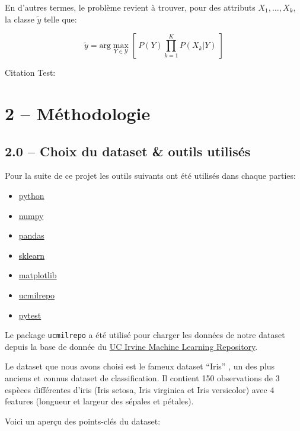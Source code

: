\documentclass[
]{article}
\providecommand{\tightlist}{%
  \setlength{\itemsep}{0pt}\setlength{\parskip}{0pt}}
\begin{document}
En d'autres termes, le problème revient à trouver, pour des attributs
\(X_1, \ldots, X_k\), la classe \(\tilde{y}\) telle que:

\[
\tilde{y} = \text{arg}\max_{Y \in \mathcal{Y}} \left[\  P(Y) \prod_{k = 1}^K{P(X_k | Y)}\  \right]
\]

Citation Test: \cite{LinearModels}

\hypertarget{muxe9thodologie}{%
\section{2 -- Méthodologie}\label{muxe9thodologie}}

\hypertarget{choix-du-dataset-outils-utilisuxe9s}{%
\subsection{2.0 -- Choix du dataset \& outils
utilisés}\label{choix-du-dataset-outils-utilisuxe9s}}

Pour la suite de ce projet les outils suivants ont été utilisés dans
chaque parties:

\begin{itemize}
\tightlist
\item
  \href{https://www.python.org/}{python}
\item
  \href{https://numpy.org/}{numpy}
\item
  \href{https://pandas.pydata.org/}{pandas}
\item
  \href{https://scikit-learn.org/stable/}{sklearn}
\item
  \href{https://matplotlib.org/}{matplotlib}
\item
  \href{https://github.com/uci-ml-repo/ucimlrepo}{ucmilrepo}
\item
  \href{https://docs.pytest.org/en/stable/}{pytest}
\end{itemize}

Le package \texttt{ucmilrepo} a été utilisé pour charger les données de
notre dataset depuis la base de donnée du
\href{https://archive.ics.uci.edu/ml/index}{UC Irvine Machine Learning
Repository}.

Le dataset que nous avons choisi est le fameux dataset ``Iris''
\cite{r.a.fisherIris1936}, un des plus anciens et connus dataset de
classification. Il contient 150 observations de 3 espèces différentes
d'iris (Iris setosa, Iris virginica et Iris versicolor) avec 4 features
(longueur et largeur des sépales et pétales).

Voici un aperçu des points-clés du dataset:
\end{document}
